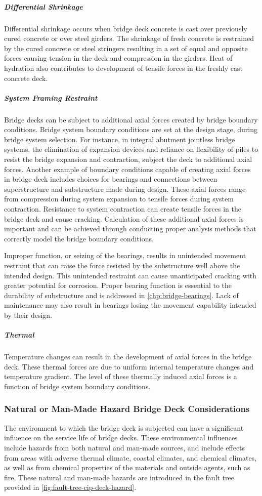 \subparagraph*{Differential Shrinkage}
Differential shrinkage occurs when bridge deck concrete is cast over previously cured concrete or over steel girders. The shrinkage of fresh concrete is restrained by the cured concrete or steel stringers resulting in a set of equal and opposite forces causing tension in the deck and compression in the girders. Heat of hydration also contributes to development of tensile forces in the freshly cast concrete deck.
\subparagraph*{System Framing Restraint}
Bridge decks can be subject to additional axial forces created by bridge boundary conditions. Bridge system boundary conditions are set at the design stage, during bridge system selection. For instance, in integral abutment jointless bridge systems, the elimination of expansion devices and reliance on flexibility of piles to resist the bridge expansion and contraction, subject the deck to additional axial forces. Another example of boundary conditions capable of creating axial forces in bridge deck includes choices for bearings and connections between superstructure and substructure made during design. These axial forces range from compression during system expansion to tensile forces during system contraction. Resistance to system contraction can create tensile forces in the bridge deck and cause cracking. Calculation of these additional axial forces is important and can be achieved through conducting proper analysis methods that correctly model the bridge boundary conditions.

Improper function, or seizing of the bearings, results in unintended movement restraint that can raise the force resisted by the substructure well above the intended design. This unintended restraint can cause unanticipated cracking with greater potential for corrosion. Proper bearing function is essential to the durability of substructure and is addressed in \cref{chp:bridge-bearings}. Lack of maintenance may also result in bearings losing the movement capability intended by their design.

\subparagraph*{Thermal}
Temperature changes can result in the development of axial forces in the bridge deck. These thermal forces are due to uniform internal temperature changes and temperature gradient. The level of these thermally induced axial forces is a function of bridge system boundary conditions.


\subsubsection{Natural or Man-Made Hazard Bridge Deck Considerations}
\label{subsubsection:natural-man-made-hazard-bridge-deck-considerations}
The environment to which the bridge deck is subjected can have a significant influence on the service life of bridge decks. These environmental influences include hazards from both natural and man-made sources, and include effects from areas with adverse thermal climate, coastal climates, and chemical climates, as well as from chemical properties of the materials and outside agents, such as fire. These natural and man-made hazards are introduced in the fault tree provided in \cref{fig:fault-tree-cip-deck-hazard}.

